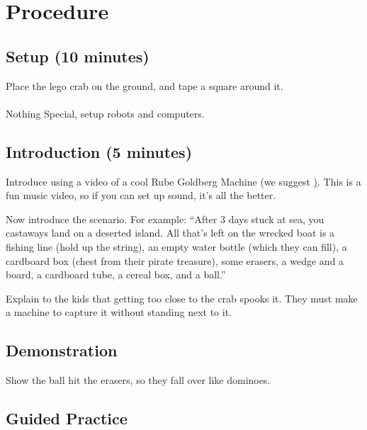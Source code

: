 \documentclass{lessonplan}
\begin{document}
  \section{Procedure}
    \subsection{Setup (10 minutes)}

      Place the lego crab on the ground, and tape a square around it.

      \paragraph{}
      Nothing Special, setup robots and computers.
    \subsection{Introduction (5 minutes)}
      Introduce using a video of a cool Rube Goldberg Machine (we suggest
      \href{https://www.youtube.com/watch?v=qybUFnY7Y8w}). This is a fun
      music video, so if you can set up sound, it's all the better.

      Now introduce the scenario. For example:
      ``After 3 days stuck at sea, you castaways land on a deserted island.
      All that's left on the wrecked boat is a fishing line (hold up the string),
      an empty water bottle (which they can fill), a cardboard box (chest from
      their pirate treasure), some erasers, a wedge and a board,
      a cardboard tube, a cereal box, and a ball.''

      Explain to the kids that getting too close to the crab spooks it.
      They must make a machine to capture it without standing next to it.

    \subsection{Demonstration}
      Show the ball hit the erasers, so they fall over like dominoes.

    \subsection{Guided Practice}

\end{document}
